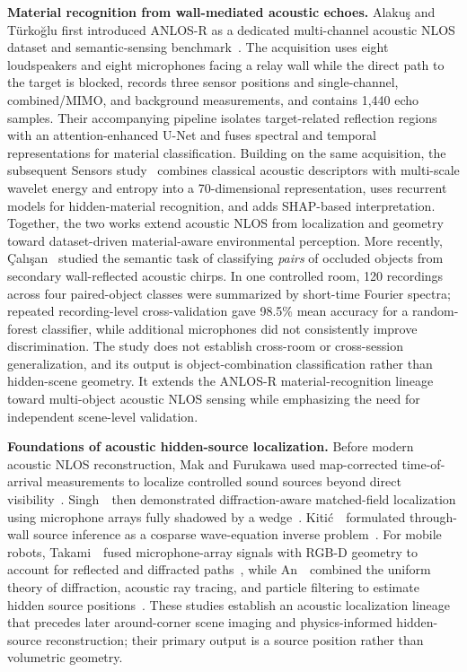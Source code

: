 \vspace{0.8mm}
\noindent \textbf{Material recognition from wall-mediated acoustic echoes.}
Alaku{\c{s}} and T{\"u}rko{\u{g}}lu first introduced ANLOS-R as a dedicated multi-channel acoustic NLOS dataset and semantic-sensing benchmark~\cite{alakusANLOSR2026}. The acquisition uses eight loudspeakers and eight microphones facing a relay wall while the direct path to the target is blocked, records three sensor positions and single-channel, combined/MIMO, and background measurements, and contains 1,440 echo samples. Their accompanying pipeline isolates target-related reflection regions with an attention-enhanced U-Net and fuses spectral and temporal representations for material classification. Building on the same acquisition, the subsequent Sensors study~\cite{alakusAcousticMaterialNLOS2026} combines classical acoustic descriptors with multi-scale wavelet energy and entropy into a 70-dimensional representation, uses recurrent models for hidden-material recognition, and adds SHAP-based interpretation. Together, the two works extend acoustic NLOS from localization and geometry toward dataset-driven material-aware environmental perception.
More recently, {\c{C}}al{\i}{\c{s}}an~\cite{calisan2026pairedacoustic} studied the semantic task of classifying \emph{pairs} of occluded objects from secondary wall-reflected acoustic chirps. In one controlled room, 120 recordings across four paired-object classes were summarized by short-time Fourier spectra; repeated recording-level cross-validation gave 98.5\% mean accuracy for a random-forest classifier, while additional microphones did not consistently improve discrimination. The study does not establish cross-room or cross-session generalization, and its output is object-combination classification rather than hidden-scene geometry. It extends the ANLOS-R material-recognition lineage toward multi-object acoustic NLOS sensing while emphasizing the need for independent scene-level validation.

\vspace{0.8mm}
\noindent \textbf{Foundations of acoustic hidden-source localization.}
Before modern acoustic NLOS reconstruction, Mak and Furukawa used map-corrected time-of-arrival measurements to localize controlled sound sources beyond direct visibility~\cite{makControlledAcousticNLOS2009}. Singh~\etal~then demonstrated diffraction-aware matched-field localization using microphone arrays fully shadowed by a wedge~\cite{singhMatchedFieldAcousticNLOS2012}. Kiti{\'c}~\etal~formulated through-wall source inference as a cosparse wave-equation inverse problem~\cite{kiticCosparseAcousticNLOS2014}. For mobile robots, Takami~\etal~fused microphone-array signals with RGB-D geometry to account for reflected and diffracted paths~\cite{takamiDiffractionReflectionAcousticNLOS2016}, while An~\etal~combined the uniform theory of diffraction, acoustic ray tracing, and particle filtering to estimate hidden source positions~\cite{anDiffractionAwareAcousticNLOS2019}. These studies establish an acoustic localization lineage that precedes later around-corner scene imaging and physics-informed hidden-source reconstruction; their primary output is a source position rather than volumetric geometry.

